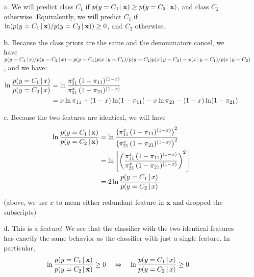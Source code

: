 \documentclass[11pt,letterpaper]{article}
\newcommand{\class}{C}
\begin{document}
\begin{enumerate}
\begin{solution}
\begin{sol}

\begin{itemize}
\item[a.] We will predict class $C_1$ if $p(y=C_1\,|\,\mathbf{x})\geq p(y=C_2\,|\,\mathbf{x})$, 
          and class $C_2$ otherwise. Equivalently, we will predict 
          $C_1$ if $\ln(p(y=C_1\,|\,\mathbf{x})/p(y=C_2\,|\,\mathbf{x}))\geq 0$,
          and $C_2$ otherwise.
\item[b.] Because the class priors are the same and the denominators cancel, 
          we have $p(y=\class_1\given x)/p(y=\class_2\given x) 
          = p(y=\class_1)p(x\given y=\class_1)/p(y=\class_2)
          p(x\given y=\class_2)=p(x \given y=\class_1)/p(x \given y=\class_2)$,
          and we have:
          \begin{align*}
          \ln \frac{p(y=\class_1 \given x)}{p(y=\class_2 \given x)} &=
          \ln \frac{\pi_{11}^{x} \, (1-\pi_{11})^{(1-x)}}{\pi_{21}^{x} \, 
          (1-\pi_{21})^{(1-x)}}\\
          &= x \ln \pi_{11} + (1-x) \ln (1 - \pi_{11}) - x \ln \pi_{21} - 
          (1-x) \ln (1 - \pi_{21})
          \end{align*}
\item[c.] Because the two features are identical, we will have 
          \begin{align*}
          \ln \frac{p(y=\class_1 \given \boldx)}{p(y=\class_2 \given \boldx)} 
          &= \ln \frac{\left(\pi_{11}^{x} \, (1-\pi_{11})^{(1-x)}\right)^2}
          {\left(\pi_{21}^{x} \, (1-\pi_{21})^{(1-x)}\right)^2}\\
          &= \ln \left[ \left( \frac{\pi_{11}^{x} \, (1-\pi_{11})^{(1-x)}}{\pi_{21}^{x} 
          \, (1-\pi_{21})^{(1-x)}} \right)^2 \right] \\
           &= 2 \ln \frac{p(y=\class_1 \given x)}{p(y=\class_2 \given x)}
         \end{align*}

         (above, we use $x$ to mean either redundant feature in $\mathbf{x}$ and dropped the subscripts)

\item[d.] This is a feature! We see that the classifier with the two identical
          features has exactly the same behavior as the classifier with just a single
          feature. In particular, 
          \begin{align*}
          \ln \frac{p(y=\class_1 \given \boldx)}{p(y=\class_2 \given \boldx)} \geq 0
          \quad &\Leftrightarrow \quad 
          \ln \frac{p(y=\class_1 \given x)}{p(y=\class_2 \given x)} \geq 0
          \end{align*}


\end{itemize}
\end{sol}
\end{solution}
\end{enumerate}
\end{document}
